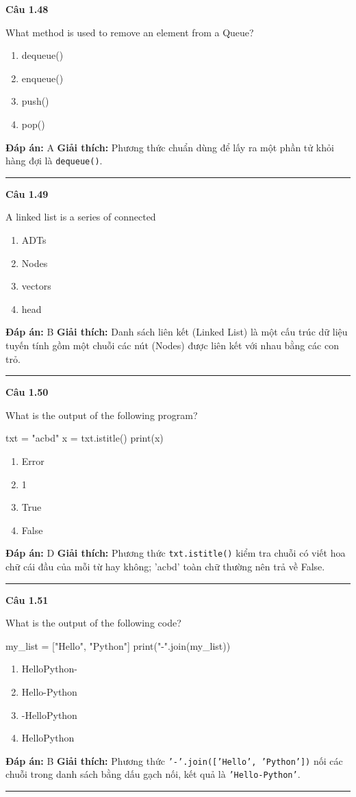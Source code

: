 \documentclass[11pt,a4paper]{article}
\newenvironment{question}[1]{%
  \par\vspace{1em}\noindent\textbf{\large Câu #1}\par\vspace{0.4em}
}{%
  \par\vspace{1em}\hrule\vspace{0.6em}
}
\newenvironment{choices}{%
  \begin{enumerate}[label=\textbf{\Alph*.},leftmargin=2.2em,itemsep=2pt,topsep=3pt]
}{%
  \end{enumerate}
}
\newcommand{\choice}{\item}
\newenvironment{codebox}{%
  \begin{tcolorbox}[colback=gray!8!white,colframe=gray!50!black,arc=1.5mm,boxrule=0.6pt,left=3mm,right=3mm,top=2.5mm,bottom=2.5mm]
  \ttfamily\small
}{%
  \end{tcolorbox}
}
\begin{document}
\begin{question}{1.48}
What method is used to remove an element from a Queue?
\begin{choices}
\choice dequeue()
\choice enqueue()
\choice push()
\choice pop()
\end{choices}
\textbf{Đáp án:} A
\textbf{Giải thích:} Phương thức chuẩn dùng để lấy ra một phần tử khỏi hàng đợi là \texttt{dequeue()}.
\end{question}

\begin{question}{1.49}
A linked list is a series of connected
\begin{choices}
\choice ADTs
\choice Nodes
\choice vectors
\choice head
\end{choices}
\textbf{Đáp án:} B
\textbf{Giải thích:} Danh sách liên kết (Linked List) là một cấu trúc dữ liệu tuyến tính gồm một chuỗi các nút (Nodes) được liên kết với nhau bằng các con trỏ.
\end{question}

\begin{question}{1.50}
What is the output of the following program?
\begin{codebox}
txt = "acbd"
x = txt.istitle()
print(x)
\end{codebox}
\begin{choices}
\choice Error
\choice 1
\choice True
\choice False
\end{choices}
\textbf{Đáp án:} D
\textbf{Giải thích:} Phương thức \texttt{txt.istitle()} kiểm tra chuỗi có viết hoa chữ cái đầu của mỗi từ hay không; 'acbd' toàn chữ thường nên trả về False.
\end{question}

\begin{question}{1.51}
What is the output of the following code?
\begin{codebox}
my_list = ["Hello", "Python"]
print("-".join(my_list))
\end{codebox}
\begin{choices}
\choice HelloPython-
\choice Hello-Python
\choice -HelloPython
\choice HelloPython
\end{choices}
\textbf{Đáp án:} B
\textbf{Giải thích:} Phương thức \texttt{'-'.join(['Hello', 'Python'])} nối các chuỗi trong danh sách bằng dấu gạch nối, kết quả là \texttt{'Hello-Python'}.
\end{question}
\end{document}
